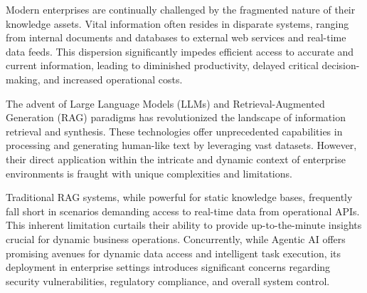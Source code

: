 \documentclass[default]{sn-jnl}%
\begin{document}
Modern enterprises are continually challenged by the fragmented nature of their knowledge assets. Vital information often resides in disparate systems, ranging from internal documents and databases to external web services and real-time data feeds. This dispersion significantly impedes efficient access to accurate and current information, leading to diminished productivity, delayed critical decision-making, and increased operational costs.

The advent of Large Language Models (LLMs) and Retrieval-Augmented Generation (RAG) paradigms has revolutionized the landscape of information retrieval and synthesis. These technologies offer unprecedented capabilities in processing and generating human-like text by leveraging vast datasets. However, their direct application within the intricate and dynamic context of enterprise environments is fraught with unique complexities and limitations.

Traditional RAG systems, while powerful for static knowledge bases, frequently fall short in scenarios demanding access to real-time data from operational APIs. This inherent limitation curtails their ability to provide up-to-the-minute insights crucial for dynamic business operations. Concurrently, while Agentic AI offers promising avenues for dynamic data access and intelligent task execution, its deployment in enterprise settings introduces significant concerns regarding security vulnerabilities, regulatory compliance, and overall system control.
\end{document}
